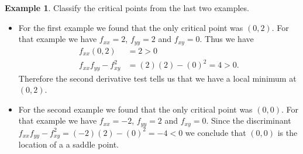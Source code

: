 \documentclass[12pt, letter]{article}
\theoremstyle{plain}
\numberwithin{theorem}{section}
\theoremstyle{definition}
\newtheorem{example}[theorem]{Example}
\begin{document}
\bigskip

\hrulefill

\bigskip

\begin{example}
Classify the critical points from the last two examples.

\smallskip

\begin{itemize}

\item[1.] For the first example we found that the only critical point was $(0,2)$. For that example we have $f_{xx} = 2$, $f_{yy} = 2$ and $f_{xy} = 0$. Thus we have
\begin{align*}
f_{xx}(0,2) &= 2 > 0\\
f_{xx}f_{yy} - f_{xy}^2 &= (2)(2) - (0)^2 = 4 >0.
\end{align*}
Therefore the second derivative test tells us that we have a local minimum at $(0,2)$.

\item[2.] For the second example we found that the only critical point was $(0,0)$. For that example we have $f_{xx} = -2$, $f_{yy} = 2$ and $f_{xy} = 0$. Since the discriminant $f_{xx}f_{yy}-f_{xy}^2 = (-2)(2)-(0)^2 = -4 <0$ we conclude that $(0,0)$ is the location of a a saddle point.
\end{itemize}
\end{example}

\bigskip

\hrulefill

\bigskip
\end{document}

